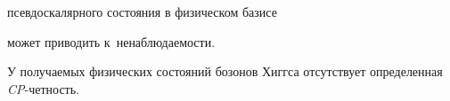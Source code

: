 
псевдоскалярного состояния в физическом базисе

может приводить к~ненаблюдаемости. 



У получаемых физических состояний бозонов Хиггса отсутствует определенная {\it CP}-четность.











